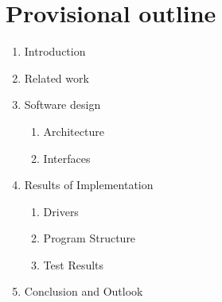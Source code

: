 %
%

\chapter{Provisional outline}
\label{chap:Provisional outline}
%
\begin{enumerate}[label=\Roman*]
	\item Introduction
	\item Related work
	\item Software design
	\begin{enumerate}[label=\Alph*]
		\item Architecture
		\item Interfaces
	\end{enumerate}
	\item Results of Implementation
	\begin{enumerate}[label=\Alph*]
		\item Drivers
		\item Program Structure
		\item Test Results
	\end{enumerate}
	\item Conclusion and Outlook
\end{enumerate}